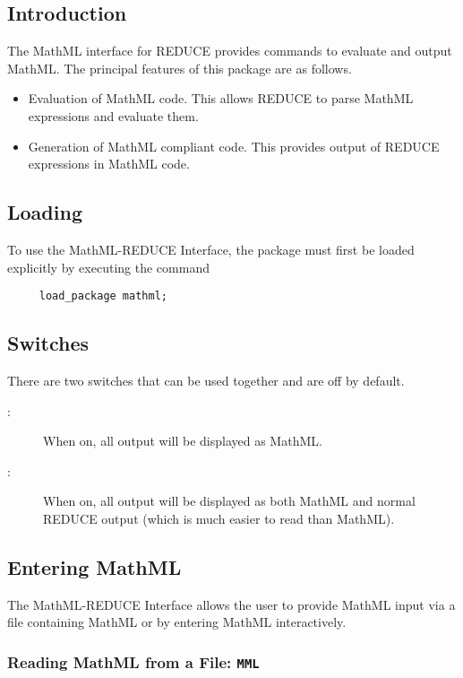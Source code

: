 \subsection{Introduction}

The MathML interface for REDUCE provides commands to evaluate and
output MathML\@.  The principal features of this package are as
follows.
\begin{itemize}
\item Evaluation of MathML code.  This allows REDUCE to parse MathML
  expressions and evaluate them.
\item Generation of MathML compliant code.  This provides output of
  REDUCE expressions in MathML code.
\end{itemize}

\subsection{Loading}

To use the MathML-REDUCE Interface, the package must first be loaded
explicitly by executing the command
\begin{verbatim}
     load_package mathml;
\end{verbatim}

\subsection{Switches}

There are two switches that can be used together and are off by
default.
\begin{description}
\item[:] When on, all output will be displayed as MathML.
\item[:] When on, all output will be displayed as both MathML
  and normal REDUCE output (which is much easier to read than MathML).
\end{description}

\subsection{Entering MathML}

The MathML-REDUCE Interface allows the user to provide MathML input
via a file containing MathML or by entering MathML interactively.

\subsubsection{Reading MathML from a File: \texttt{MML}}

